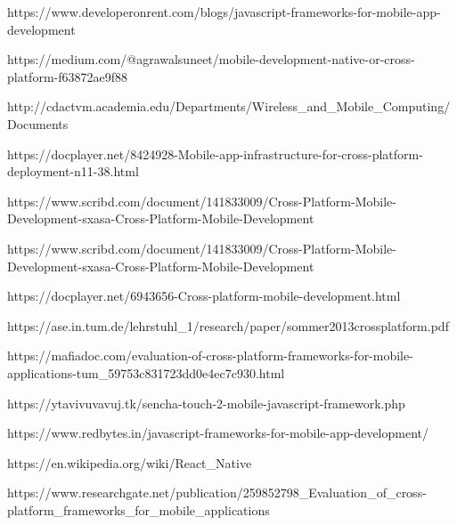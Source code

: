 \documentclass[12pt]{extreport}
\begin{document}
%
%
% 
\newpage
\begin{thebibliography}{20}

https://www.developeronrent.com/blogs/javascript-frameworks-for-mobile-app-development

https://medium.com/@agrawalsuneet/mobile-development-native-or-cross-platform-f63872ae9f88

http://cdactvm.academia.edu/Departments/Wireless\_and\_Mobile\_Computing/Documents

https://docplayer.net/8424928-Mobile-app-infrastructure-for-cross-platform-deployment-n11-38.html

https://www.scribd.com/document/141833009/Cross-Platform-Mobile-Development-sxasa-Cross-Platform-Mobile-Development

https://www.scribd.com/document/141833009/Cross-Platform-Mobile-Development-sxasa-Cross-Platform-Mobile-Development

https://docplayer.net/6943656-Cross-platform-mobile-development.html

https://ase.in.tum.de/lehrstuhl\_1/research/paper/sommer2013crossplatform.pdf

https://mafiadoc.com/evaluation-of-cross-platform-frameworks-for-mobile-applications-tum\_59753c831723dd0e4ec7c930.html

https://ytavivuvavuj.tk/sencha-touch-2-mobile-javascript-framework.php

https://www.redbytes.in/javascript-frameworks-for-mobile-app-development/

https://en.wikipedia.org/wiki/React\_Native

https://www.researchgate.net/publication/259852798\_Evaluation\_of\_cross-platform\_frameworks\_for\_mobile\_applications
\end{thebibliography}
\end{document}
